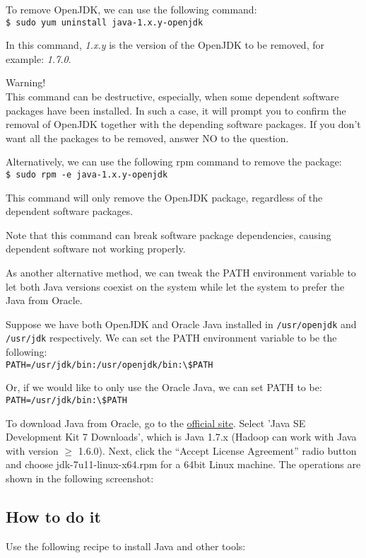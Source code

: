 To remove OpenJDK, we can use the following command: \\
\verb|$ sudo yum uninstall java-1.x.y-openjdk|

In this command, \emph{1.x.y} is the version of the OpenJDK to be removed, for example: \emph{1.7.0}.

\begin{warning}
Warning! \\
This command can be destructive, especially, when some dependent software packages have been installed. In such a case, it will prompt you to confirm the removal of OpenJDK together with the depending software packages. If you don't want all the packages to be removed, answer NO to the question.
\end{warning}

Alternatively, we can use the following rpm command to remove the package:\\
\verb|$ sudo rpm -e java-1.x.y-openjdk|

This command will only remove the OpenJDK package, regardless of the dependent software packages.

Note that this command can break software package dependencies, causing dependent software not working properly.

As another alternative method, we can tweak the PATH environment variable to let both Java versions coexist on the system while let the system to prefer the Java from Oracle.

Suppose we have both OpenJDK and Oracle Java installed in \verb|/usr/openjdk| and \verb|/usr/jdk| respectively. We can set the PATH environment variable to be the following: \\
\verb|PATH=/usr/jdk/bin:/usr/openjdk/bin:\$PATH|

Or, if we would like to only use the Oracle Java, we can set PATH to be: \\
\verb|PATH=/usr/jdk/bin:\$PATH|

To download Java from Oracle, go to the \href{http://www.oracle.com/technetwork/java/javase/downloads/index.html}{official site}. Select 'Java SE Development Kit 7 Downloads', which is Java 1.7.x (Hadoop can work with Java with version $\ge$ 1.6.0). Next, click the ``Accept License Agreement'' radio button and choose jdk-7u11-linux-x64.rpm for a 64bit Linux machine. The operations are shown in the following screenshot:

\subsection*{How to do it}
Use the following recipe to install Java and other tools:

